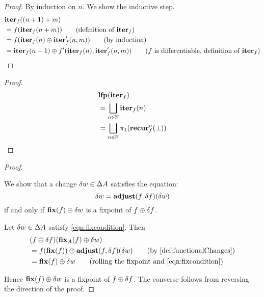 \iterDerivativesN*
\begin{proof}
  \label{prf:iterDerivativesN}
  By induction on $n$. We show the inductive step.
  \begin{align*}
    &\iter_f((n+1) + m)\\
    &=f(\iter_f(n + m)) \tag{definition of $\iter_f$}\\
    &=f(\iter_f(n) \cplus \derive{\iter_f}(n, m)) \tag{by induction}\\
    &=\iter_f(n+1) \cplus \derive{f}(\iter_f(n), \derive{\iter_f}(n, m)) \tag{$f$ is differentiable, definition of $\iter_f$}
  \end{align*}
\end{proof}

\fixpointIter*
\begin{proof}
  \label{prf:fixpointIter}
  \begin{align*}
    &\mathbf{lfp}(\mathbf{iter}_f)\\
    &=\bigsqcup_{n \in \mathbb{N}} \mathbf{iter}_f(n)\\
    &=\bigsqcup_{n \in \mathbb{N}} \pi_1 (\mathbf{recur}_f^n(\bot))
  \end{align*}
\end{proof}

\fixpointPseudoDerivatives*
\begin{proof}
  \label{prf:fixpointPseudoDerivatives}
  
  We show that a change $\delta w \in \Delta A$ satisfies
  the equation:
  \begin{equation}\label{eqn:fixcondition}
    \delta w = \mathbf{adjust}(f, \delta f)(\delta w)
  \end{equation}
  if and only if $\mathbf{fix}(f) \oplus \delta w$ is a fixpoint of $f \oplus \delta f$.

  Let $\delta w \in \Delta A$ satisfy \cref{eqn:fixcondition}. Then
  \begin{align*}
    &(f \cplus \change{f})(\fixpoint_A(f) \cplus \change{w})\\
    &= f(\fixpoint(f))
    \cplus
    \adjust(f, \change{f})(\change{w})
    \tag{by \cref{def:functionalChanges}}\\
    &= \fixpoint(f)
    \cplus
    \change{w}
    \tag{rolling the fixpoint and \cref{eqn:fixcondition}}
  \end{align*}

  Hence $\mathbf{fix}(f) \oplus \delta w$ is a fixpoint of $f \oplus \delta f$. The converse
  follows from reversing the direction of the proof.
\end{proof}

